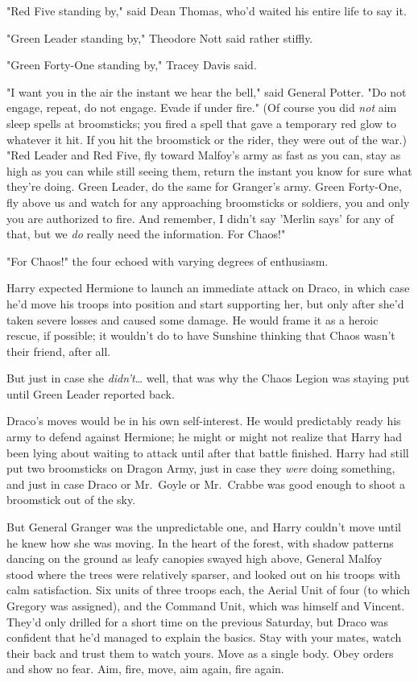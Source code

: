 "Red Five standing by," said Dean Thomas, who'd waited his entire life to say it.

"Green Leader standing by," Theodore Nott said rather stiffly.

"Green Forty-One standing by," Tracey Davis said.

"I want you in the air the instant we hear the bell," said General Potter. "Do not engage, repeat, do not engage. Evade if under fire." (Of course you did \emph{not} aim sleep spells at broomsticks; you fired a spell that gave a temporary red glow to whatever it hit. If you hit the broomstick or the rider, they were out of the war.) "Red Leader and Red Five, fly toward Malfoy's army as fast as you can, stay as high as you can while still seeing them, return the instant you know for sure what they're doing. Green Leader, do the same for Granger's army. Green Forty-One, fly above us and watch for any approaching broomsticks or soldiers, you and only you are authorized to fire. And remember, I didn't say 'Merlin says' for any of that, but we \emph{do} really need the information. For Chaos!"

"For Chaos!" the four echoed with varying degrees of enthusiasm.

Harry expected Hermione to launch an immediate attack on Draco, in which case he'd move his troops into position and start supporting her, but only after she'd taken severe losses and caused some damage. He would frame it as a heroic rescue, if possible; it wouldn't do to have Sunshine thinking that Chaos wasn't their friend, after all.

But just in case she \emph{didn't}{\ldots} well, that was why the Chaos Legion was staying put until Green Leader reported back.

Draco's moves would be in his own self-interest. He would predictably ready his army to defend against Hermione; he might or might not realize that Harry had been lying about waiting to attack until after that battle finished. Harry had still put two broomsticks on Dragon Army, just in case they \emph{were} doing something, and just in case Draco or Mr.~Goyle or Mr.~Crabbe was good enough to shoot a broomstick out of the sky.

But General Granger was the unpredictable one, and Harry couldn't move until he knew how she was moving.
\sbreak
In the heart of the forest, with shadow patterns dancing on the ground as leafy canopies swayed high above, General Malfoy stood where the trees were relatively sparser, and looked out on his troops with calm satisfaction. Six units of three troops each, the Aerial Unit of four (to which Gregory was assigned), and the Command Unit, which was himself and Vincent. They'd only drilled for a short time on the previous Saturday, but Draco was confident that he'd managed to explain the basics. Stay with your mates, watch their back and trust them to watch yours. Move as a single body. Obey orders and show no fear. Aim, fire, move, aim again, fire again.

